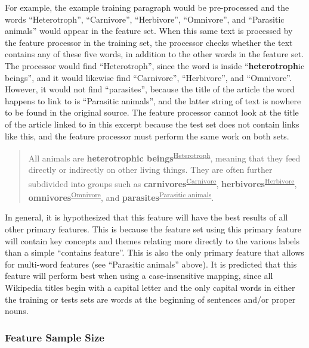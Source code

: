 For example, the example training paragraph would be pre-processed and the words ``Heterotroph'', ``Carnivore'', ``Herbivore'', ``Omnivore'', and ``Parasitic animals'' would appear in the feature set.
When this same text is processed by the feature processor in the training set, the processor checks whether the text contains any of these five words, in addition to the other words in the feature set.
The processor would find ``Heterotroph'', since the word is inside ``{\bf heterotroph}ic beings'', and it would likewise find ``Carnivore'', ``Herbivore'', and ``Omnivore''.
However, it would not find ``parasites'', because the title of the article the word happens to link to is ``Parasitic animals'', and the latter string of text is nowhere to be found in the original source.
The feature processor cannot look at the title of the article linked to in this excerpt because the test set does not contain links like this, and the feature processor must perform the same work on both sets.

\begin{quote}
All animals are {\bf heterotrophic beings}\textsuperscript{\underline{Heterotroph}}, meaning that they feed directly or indirectly on other living things. They are often further subdivided into groups such as {\bf carnivores}\textsuperscript{\underline{Carnivore}}, {\bf herbivores}\textsuperscript{\underline{Herbivore}}, {\bf omnivores}\textsuperscript{\underline{Omnivore}}, and {\bf parasites}\textsuperscript{\underline{Parasitic animals}}.
\end{quote}

In general, it is hypothesized that this feature will have the best results of all other primary features.
This is because the feature set using this primary feature will contain key concepts and themes relating more directly to the various labels than a simple ``contains feature''.
This is also the only primary feature that allows for multi-word features (see ``Parasitic animals'' above).
It is predicted that this feature will perform best when using a case-insensitive mapping, since all Wikipedia titles begin with a capital letter and the only capital words in either the training or tests sets are words at the beginning of sentences and/or proper nouns.

\subsubsection{Feature Sample Size}
\label{sec:sample-size}

